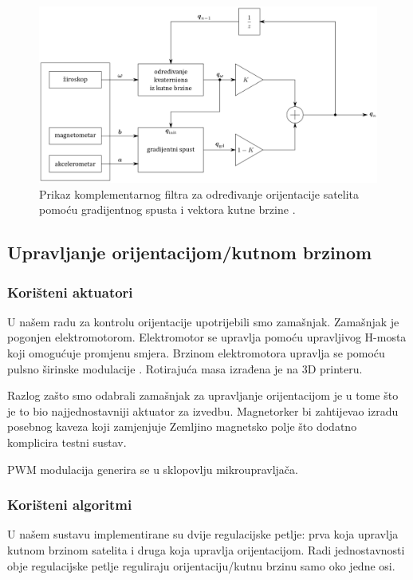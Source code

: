\documentclass[times, utf8, diplomski, numeric]{templates/template}
\begin{document}
{{{{                \begin{figure}[htb]
                \centering
                \includegraphics[width=1.0\textwidth]{images/komp_filt_fig.png}
                \caption{Prikaz komplementarnog filtra za određivanje orijentacije satelita pomoću gradijentnog spusta i vektora kutne brzine \cite{uvod_u_svemirske}.}
                \label{fig:komp_filt_fig}
                \end{figure}
            }
        }

        \subsection{Upravljanje orijentacijom/kutnom brzinom}{
        \label{subsection:upravljanje_orijen}
            \subsubsection{Korišteni aktuatori}{
                U našem radu za kontrolu orijentacije upotrijebili smo zamašnjak. Zamašnjak je pogonjen elektromotorom. Elektromotor se upravlja pomoću upravljivog H-mosta koji omogućuje promjenu smjera. Brzinom elektromotora upravlja se pomoću pulsno širinske modulacije . Rotirajuća masa izrađena je na 3D printeru.

                Razlog zašto smo odabrali zamašnjak za upravljanje orijentacijom je u tome što je to bio najjednostavniji aktuator za izvedbu. Magnetorker bi zahtijevao izradu posebnog kaveza koji zamjenjuje Zemljino magnetsko polje što dodatno komplicira testni sustav.

                PWM modulacija generira se u sklopovlju mikroupravljača.
            }

            \subsubsection{Korišteni algoritmi}{
                U našem sustavu implementirane su dvije regulacijske petlje: prva koja upravlja kutnom brzinom satelita i druga koja upravlja orijentacijom. Radi jednostavnosti obje regulacijske petlje reguliraju orijentaciju/kutnu brzinu samo oko jedne osi.

}}}}
\end{document}
